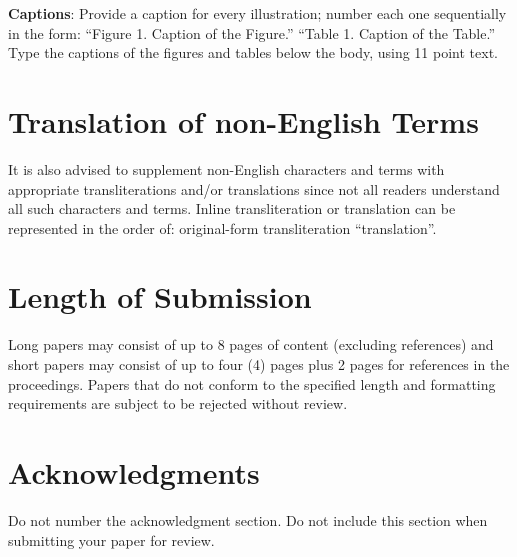 \documentclass[11pt]{article}
\begin{document}
{\bf Captions}: Provide a caption for every illustration; number each one
sequentially in the form:  ``Figure 1. Caption of the Figure.'' ``Table 1.
Caption of the Table.''  Type the captions of the figures and 
tables below the body, using 11 point text.  

\section{Translation of non-English Terms}

It is also advised to supplement non-English characters and terms
with appropriate transliterations and/or translations
since not all readers understand all such characters and terms.
Inline transliteration or translation can be represented in
the order of: original-form transliteration ``translation''.

\section{Length of Submission}
\label{sec:length}

Long papers may consist of up to 8 pages of content (excluding
references) and short papers may consist of up to 
four (4) pages plus 2 pages for references in the proceedings.  Papers that do not conform to the
specified length and formatting requirements are subject to be
rejected without review.




\section*{Acknowledgments}

Do not number the acknowledgment section. Do not include this section
when submitting your paper for review.



\end{document}

